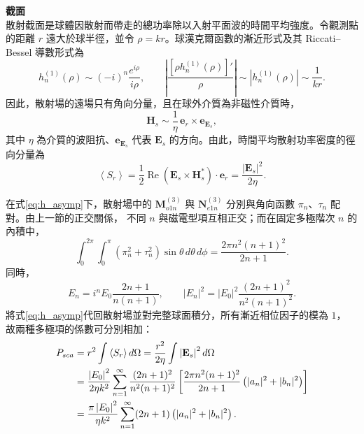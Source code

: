\textbf{截面}\\
散射截面是球體因散射而帶走的總功率除以入射平面波的時間平均強度。令觀測點的距離 $r$ 遠大於球半徑，並令
\(\rho=kr\)。球漢克爾函數的漸近形式及其 Riccati--Bessel 導數形式為
\begin{equation}
    h_n^{(1)}(\rho)\sim (-i)^n\frac{e^{i\rho}}{i\rho},
    \qquad
    \left|\frac{\left[\rho h_n^{(1)}(\rho)\right]'}{\rho}\right|
    \sim \left|h_n^{(1)}(\rho)\right|
    \sim \frac{1}{kr}.
    \label{eq:h_asymp}
\end{equation}
因此，散射場的遠場只有角向分量，且在球外介質為非磁性介質時，
\begin{equation}
    \mathbf{H}_s\sim \frac{1}{\eta}\,\mathbf{e}_r\times\mathbf{e}_{\mathbf{E}_s},
\end{equation}
其中 $\eta$ 為介質的波阻抗、$\mathbf{e}_{\mathbf{E}_s}$ 代表
$\mathbf{E}_s$ 的方向。由此，時間平均散射功率密度的徑向分量為
\begin{equation}
    \left\langle S_r\right\rangle
    =\frac{1}{2}\operatorname{Re}\left(\mathbf{E}_s\times\mathbf{H}_s^*\right)
    \cdot\mathbf{e}_r
    =\frac{\left|\mathbf{E}_s\right|^2}{2\eta}.
    \label{eq:far_poynting}
\end{equation}

在式\eqref{eq:h_asymp}下，散射場中的
\(\mathbf{M}^{(3)}_{o1n}\) 與 \(\mathbf{N}^{(3)}_{e1n}\)
分別與角向函數 $\pi_n$、$\tau_n$ 配對。由上一節的正交關係，
不同 $n$ 與磁電型項互相正交；而在固定多極階次 $n$ 的內積中，
\begin{equation}
    \int_0^{2\pi}\int_0^\pi
    \left(\pi_n^2+\tau_n^2\right)\sin\theta\,d\theta\,d\phi
    =
    \frac{2\pi n^2(n+1)^2}{2n+1}.
    \label{eq:pie_tau_norm}
\end{equation}
同時，
\begin{equation}
    E_n=i^nE_0\frac{2n+1}{n(n+1)},
    \qquad
    \left|E_n\right|^2
    =\left|E_0\right|^2
    \frac{(2n+1)^2}{n^2(n+1)^2}.
\end{equation}
將式\eqref{eq:h_asymp}代回散射場並對完整球面積分，所有漸近相位因子的模為 $1$，
故兩種多極項的係數可分別相加：
\begin{align}
    P_{sca}
    &=r^2\int \left\langle S_r\right\rangle d\Omega
    =\frac{r^2}{2\eta}
      \int\left|\mathbf{E}_s\right|^2d\Omega \notag\\
    &=\frac{\left|E_0\right|^2}{2\eta k^2}
      \sum_{n=1}^{\infty}
      \frac{(2n+1)^2}{n^2(n+1)^2}
      \left[
      \frac{2\pi n^2(n+1)^2}{2n+1}
      \left(|a_n|^2+|b_n|^2\right)
      \right] \notag\\
    &=\frac{\pi\left|E_0\right|^2}{\eta k^2}
      \sum_{n=1}^{\infty}(2n+1)
      \left(|a_n|^2+|b_n|^2\right).
    \label{eq:Psca}
\end{align}

